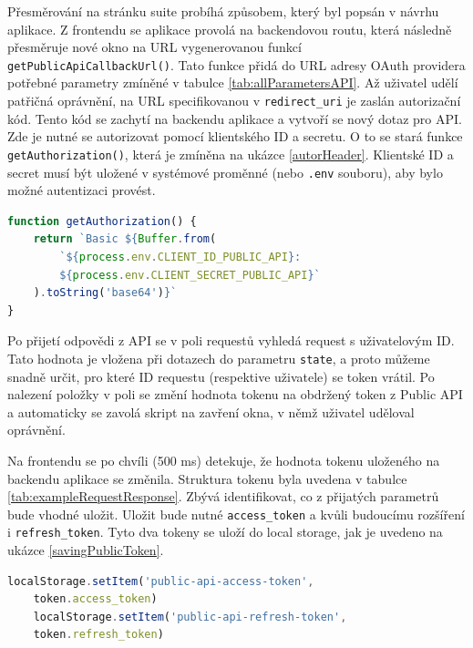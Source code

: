\documentclass[czech, bc, kiv, he, iso690numb]{fasthesis}
\begin{document}
Přesměrování na stránku suite probíhá způsobem, který byl popsán v návrhu aplikace. Z frontendu se aplikace provolá na backendovou routu, která následně přesměruje nové okno
na URL vygenerovanou funkcí \texttt{getPublicApiCallbackUrl()}. Tato funkce přidá do URL adresy OAuth providera potřebné parametry zmíněné v tabulce \ref{tab:allParametersAPI}.
Až uživatel udělí patřičná oprávnění, na URL specifikovanou v \texttt{redirect\_uri} je zaslán autorizační kód. Tento kód se zachytí na backendu aplikace a
vytvoří se nový dotaz pro API. Zde je nutné se autorizovat pomocí klientského ID a secretu. O to se stará funkce \texttt{getAuthorization()}, která je zmíněna na 
ukázce \ref{autorHeader}. Klientské ID a secret musí být uložené v systémové proměnné (nebo \texttt{.env} souboru), aby bylo možné autentizaci provést.

\begin{lstlisting}[language=Javascript, caption={Vytvoření autozirační hlavičky pro následnou autentizaci}, label=autorHeader]
function getAuthorization() {
	return `Basic ${Buffer.from(
		`${process.env.CLIENT_ID_PUBLIC_API}:
		${process.env.CLIENT_SECRET_PUBLIC_API}`
	).toString('base64')}`
}
\end{lstlisting}

Po přijetí odpovědi z API se v poli requestů vyhledá request s uživatelovým ID. Tato hodnota je vložena při dotazech do parametru \texttt{state}, a proto můžeme snadně
určit, pro které ID requestu (respektive uživatele) se token vrátil. Po nalezení položky v poli se změní hodnota tokenu na obdržený token z Public API a automaticky se
zavolá skript na zavření okna, v němž uživatel uděloval oprávnění.

Na frontendu se po chvíli (500 ms) detekuje, že hodnota tokenu uloženého na backendu aplikace se změnila. Struktura tokenu byla uvedena v tabulce \ref{tab:exampleRequestResponse}.
Zbývá identifikovat, co z přijatých parametrů bude vhodné uložit. Uložit bude nutné \texttt{access\_token} a kvůli budoucímu rozšíření i \texttt{refresh\_token}. Tyto
dva tokeny se uloží do local storage, jak je uvedeno na ukázce \ref{savingPublicToken}.

\begin{lstlisting}[language=Javascript, caption={Ukládání Public API tokenů do local storage}, label=savingPublicToken]
	localStorage.setItem('public-api-access-token', 
	token.access_token)
	localStorage.setItem('public-api-refresh-token', 
	token.refresh_token)
\end{lstlisting}
\end{document}
